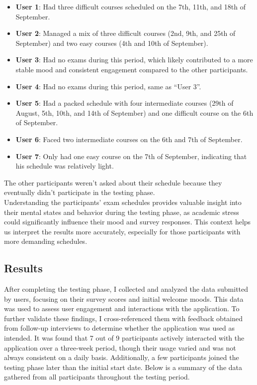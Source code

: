 \begin{itemize}
    \item \textbf{User 1}: Had three difficult courses scheduled on the 7th, 11th, and 18th of September.
    \item \textbf{User 2}: Managed a mix of three difficult courses (2nd, 9th, and 25th of September) and two easy courses (4th and 10th of September).
    \item \textbf{User 3}: Had no exams during this period, which likely contributed to a more stable mood and consistent engagement compared to the other participants.
    \item \textbf{User 4}: Had no exams during this period, same as ``User 3''.
    \item \textbf{User 5}: Had a packed schedule with four intermediate courses (29th of August, 5th, 10th, and 14th of September) and one difficult course on the 6th of September.
    \item \textbf{User 6}: Faced two intermediate courses on the 6th and 7th of September.
    \item \textbf{User 7}: Only had one easy course on the 7th of September, indicating that his schedule was relatively light.
\end{itemize}

\noindent The other participants weren't asked about their schedule because they eventually didn't participate in the testing phase.\vspace{5mm} \\
Understanding the participants' exam schedules provides valuable insight into their mental states and behavior during the testing phase, as academic stress could significantly influence their mood and survey responses. This context helps us interpret the results more accurately, especially for those participants with more demanding schedules.

\subsection{Results}

After completing the testing phase, I collected and analyzed the data submitted by users, focusing on their survey scores and initial welcome moods. This data was used to assess user engagement and interactions with the application. To further validate these findings, I cross-referenced them with feedback obtained from follow-up interviews to determine whether the application was used as intended. It was found that 7 out of 9 participants actively interacted with the application over a three-week period, though their usage varied and was not always consistent on a daily basis. Additionally, a few participants joined the testing phase later than the initial start date. Below is a summary of the data gathered from all participants throughout the testing period.

